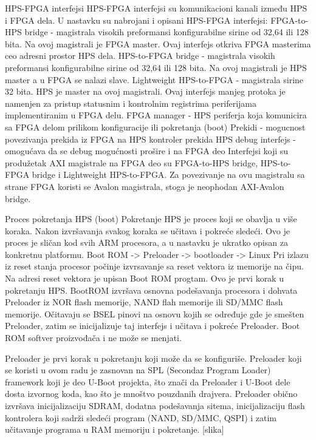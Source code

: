 HPS-FPGA interfejsi
HPS-FPGA interfejsi su komunikacioni kanali između HPS i FPGA dela. U nastavku su nabrojani i opisani HPS-FPGA interfejsi:
FPGA-to-HPS bridge - magistrala visokih preformansi konfigurabilne sirine od 32,64 ili 128 bita. Na ovoj magistrali je FPGA master. Ovaj interfejs otkriva FPGA masterima ceo adresni prostor HPS dela.
HPS-to-FPGA bridge - magistrala visokih preformansi konfigurabilne sirine od 32,64 ili 128 bita. Na ovoj magistrali je HPS master a u FPGA se nalazi slave.
Lightweight HPS-to-FPGA - magistrala sirine 32 bita. HPS je master na ovoj magistrali. Ovaj interfejs manjeg protoka je namenjen za pristup statusnim i kontrolnim registrima periferijama implementiranim u FPGA delu.
FPGA manager - HPS periferja koja komunicira sa FPGA delom prilikom konfiguracije ili pokretanja (boot)
Prekidi - mogucnost povezivanja prekida iz FPGA na HPS kontroler prekida
HPS debug interfejs - omogućava da se debug mogućnosti prošire i na FPGA deo
Interfejsi koji su produžetak AXI magistrale na FPGA deo su FPGA-to-HPS bridge, HPS-to-FPGA bridge i Lightweight HPS-to-FPGA. Za povezivanje na ovu magistralu sa strane FPGA koristi se Avalon magistrala, stoga je neophodan AXI-Avalon bridge.

Proces pokretanja HPS (boot)
Pokretanje HPS je proces koji se obavlja u više koraka. Nakon izvršavanja svakog koraka se učitava i pokreće sledeći. Ovo je proces je sličan kod svih ARM procesora, a u nastavku je ukratko opisan za konkretnu platformu.
Boot ROM -> Preloader -> bootloader -> Linux
Pri izlazu iz reset stanja procesor počinje izvrsavanje sa reset vektora iz memorije na čipu. Na adresi reset vektora je upisan Boot ROM progtam. Ovo je prvi korak u pokretanju HPS. BootROM izvršava osnovna podešavanja procesora i dohvata Preloader iz NOR flash memorije, NAND flah memorije ili SD/MMC flash memorije. Očitavaju se BSEL pinovi na osnovu kojih se određuje gde je smešten Preloader, zatim se inicijalizuje taj interfejs i učitava i pokreće Preloader. Boot ROM softver proizvođača i ne može se menjati. 

Preloader je prvi korak u pokretanju koji može da se konfiguriše. Preloader koji se koristi u ovom radu je zasnovan na SPL (Secondaz Program Loader) framework koji je deo U-Boot projekta, što znači da Preloader i U-Boot dele dosta izvornog koda, kao što je mnoštvo pouzdanih drajvera. Preloader obično izvršava inicijalizaciju SDRAM, dodatna podešavanja sitema, inicijalizaciju flash kontrolera koji sadrži sledeći program (NAND, SD/MMC, QSPI) i zatim učitavanje programa u RAM memoriju i pokretanje.
[slika]

